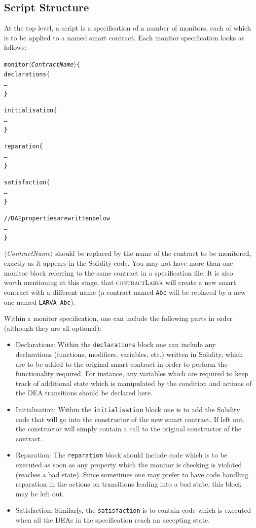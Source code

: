 \documentclass{article}
\newcommand{\contractlarva}{\textsc{contractLarva}\xspace}
\newcommand{\keyword}[1]{\textit{$\langle$#1$\rangle$}}
\begin{document}
  \subsection{Script Structure}

  At the top level, a script is a specification of a number of monitors, each of which is to be applied to a named smart contract. Each monitor specification looks as follows:

  \small\begin{alltt}
  monitor \keyword{ContractName} \{
    declarations \{
      \ldots
    \}
    
    initialisation \{
      \ldots
    \}

    reparation \{
      \ldots
    \}

    satisfaction \{
      \ldots
    \}

    // DAE properties are written below
    \ldots
  \}
  \end{alltt}\normalsize
 
  \keyword{ContractName} should be replaced by the name of the contract to be monitored, exactly as it appears in the Solidity code. You may not have more than one monitor block referring to the same contract in a specification file. It is also worth mentioning at this stage, that \contractlarva will create a new smart contract with a different name (a contract named \texttt{Abc} will be replaced by a new one named \texttt{LARVA\_Abc}).
  
  Within a monitor specification, one can include the following parts in order (although they are all optional):
  
  \begin{itemize}
    \item Declarations: Within the \texttt{declarations} block one can include any declarations (functions, modifiers, variables, etc.)  written in Solidity, which are to be added to the original smart contract in order to perform the functionality required. For instance, any variables which are required to keep track of additional state which is manipulated by the condition and actions of the DEA transitions should be declared here.
    \item Initialisation: Within the \texttt{initialisation} block one is to add the Solidity code that will go into the constructor of the new smart contract. If left out, the constructor will simply contain a call to the original constructor of the contract.
    \item Reparation: The \texttt{reparation} block should include code which is to be executed as soon as any property which the monitor is checking is violated (reaches a bad state). Since sometimes one may prefer to have code handling reparation in the actions on transitions leading into a bad state, this block may be left out.
    \item Satisfaction: Similarly, the \texttt{satisfaction} is to contain code which is executed when all the DEAs in the specification reach an accepting state.
  \end{itemize}
\end{document}
